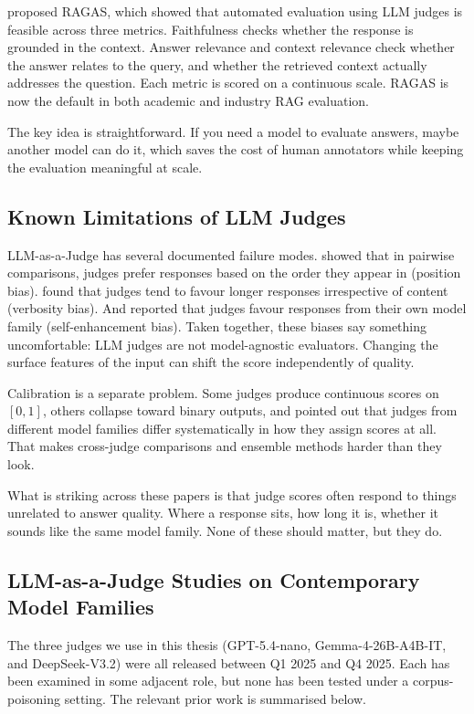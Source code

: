\citet{es2024ragas} proposed RAGAS, which showed that automated evaluation using LLM judges is feasible across three metrics. Faithfulness checks whether the response is grounded in the context. Answer relevance and context relevance check whether the answer relates to the query, and whether the retrieved context actually addresses the question. Each metric is scored on a continuous scale. RAGAS is now the default in both academic and industry RAG evaluation.

The key idea is straightforward. If you need a model to evaluate answers, maybe another model can do it, which saves the cost of human annotators while keeping the evaluation meaningful at scale.

\subsection{Known Limitations of LLM Judges}

LLM-as-a-Judge has several documented failure modes. \citet{wang2023large} showed that in pairwise comparisons, judges prefer responses based on the order they appear in (position bias). \citet{saito2023verbosity} found that judges tend to favour longer responses irrespective of content (verbosity bias). And \citet{panickssery2024self} reported that judges favour responses from their own model family (self-enhancement bias). Taken together, these biases say something uncomfortable: LLM judges are not model-agnostic evaluators. Changing the surface features of the input can shift the score independently of quality.

Calibration is a separate problem. Some judges produce continuous scores on $[0, 1]$, others collapse toward binary outputs, and \citet{zheng2023judging} pointed out that judges from different model families differ systematically in how they assign scores at all. That makes cross-judge comparisons and ensemble methods harder than they look.

What is striking across these papers is that judge scores often respond to things unrelated to answer quality. Where a response sits, how long it is, whether it sounds like the same model family. None of these should matter, but they do.

\subsection{LLM-as-a-Judge Studies on Contemporary Model Families}

The three judges we use in this thesis (GPT-5.4-nano, Gemma-4-26B-A4B-IT, and DeepSeek-V3.2) were all released between Q1 2025 and Q4 2025. Each has been examined in some adjacent role, but none has been tested under a corpus-poisoning setting. The relevant prior work is summarised below.

